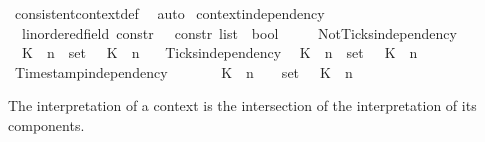 \begin{isabellebody}
%
\isadelimproof
%
\endisadelimproof
%
\isatagproof
{}\isamarkupfalse%
\ consistent{\isacharunderscore}context{\isacharunderscore}def\ \isamarkupfalse%
\ auto\isanewline
\isanewline
%
%
\endisatagproof
{\isafoldproof}%
%
\isadelimproof
\isanewline
%
\endisadelimproof
{}\isamarkupfalse%
\ context{\isacharunderscore}independency\isanewline
\ \ {\isacharcolon}{\isacharcolon}{\isacartoucheopen}{\isacharparenleft}{\isacharprime}{\isasymtau}{\isacharcolon}{\isacharcolon}linordered{\isacharunderscore}field{\isacharparenright}\ constr\ {\isasymRightarrow}\ {\isacharprime}{\isasymtau}\ constr\ list\ {\isasymRightarrow}\ bool{\isacartoucheclose}\ {\isacharparenleft}{\isacartoucheopen}{\isacharunderscore}\ {\isasymbowtie}\ {\isacharunderscore}{\isacartoucheclose}{\isacharparenright}\isanewline
{}\isanewline
\ \ NotTicks{\isacharunderscore}independency{\isacharcolon}\isanewline
\ \ {\isacartoucheopen}{\isacharparenleft}K\ {\isasymUp}\ n{\isacharparenright}\ {\isasymnotin}\ set\ {\isasymGamma}\ {\isasymLongrightarrow}\ {\isacharparenleft}K\ {\isasymnot}{\isasymUp}\ n{\isacharparenright}\ {\isasymbowtie}\ {\isasymGamma}{\isacartoucheclose}\isanewline
{\isacharbar}\ Ticks{\isacharunderscore}independency{\isacharcolon}\isanewline
\ \ {\isacartoucheopen}{\isacharparenleft}K\ {\isasymnot}{\isasymUp}\ n{\isacharparenright}\ {\isasymnotin}\ set\ {\isasymGamma}\ {\isasymLongrightarrow}\ {\isacharparenleft}K\ {\isasymUp}\ n{\isacharparenright}\ {\isasymbowtie}\ {\isasymGamma}{\isacartoucheclose}\isanewline
{\isacharbar}\ Timestamp{\isacharunderscore}independency{\isacharcolon}\isanewline
\ \ {\isacartoucheopen}{\isacharparenleft}{\isasymnexists}{\isasymtau}{\isacharprime}{\isachardot}\ {\isasymtau}{\isacharprime}\ {\isacharequal}\ {\isasymtau}\ {\isasymand}\ {\isacharparenleft}K\ {\isasymDown}\ n\ {\isacharat}\ {\isasymtau}{\isacharparenright}\ {\isasymin}\ set\ {\isasymGamma}{\isacharparenright}\ {\isasymLongrightarrow}\ {\isacharparenleft}K\ {\isasymDown}\ n\ {\isacharat}\ {\isasymtau}{\isacharparenright}\ {\isasymbowtie}\ {\isasymGamma}{\isacartoucheclose}%
\isadelimdocument
%
\endisadelimdocument
%
\isatagdocument
%
\isamarkuptrue%
%
\isamarkuptrue%
%
\endisatagdocument
{\isafolddocument}%
%
\isadelimdocument
%
\endisadelimdocument
%
\begin{isamarkuptext}%
The interpretation of a context is the intersection of the interpretation 
  of its components.%

\end{isamarkuptext}
\end{isabellebody}
